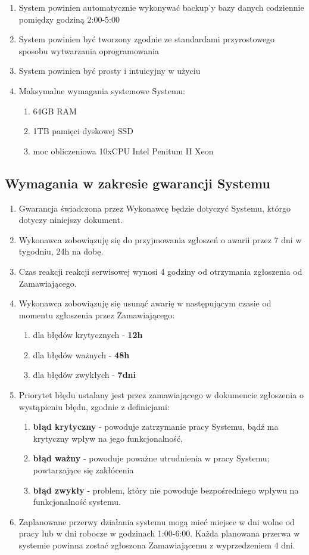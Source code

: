 \documentclass{article}
\begin{document}
\begin{enumerate}
	\item System powinien automatycznie wykonywać backup’y bazy danych codziennie pomiędzy godziną 2:00-5:00
	\item System powinien być tworzony zgodnie ze standardami przyrostowego sposobu  wytwarzania oprogramowania
	\item System powinien być prosty i intuicyjny w użyciu
	\item Maksymalne wymagania systemowe Systemu:
	\begin{enumerate}
		\item 64GB RAM
		\item 1TB pamięci dyskowej SSD
		\item moc obliczeniowa 10xCPU Intel Penitum II Xeon
	\end{enumerate}

	
\end{enumerate}


\subsection{Wymagania w zakresie gwarancji Systemu}
\begin{enumerate}
	\item Gwarancja świadczona przez Wykonawcę będzie dotyczyć Systemu, którgo dotyczy niniejszy dokument.
	\item Wykonawca zobowiązuję się do przyjmowania zgłoszeń o awarii przez 7 dni w tygodniu, 24h na dobę.
	\item Czas reakcji reakcji serwisowej wynosi 4 godziny od otrzymania zgłoszenia od Zamawiającego.
	\item Wykonawca zobowiązuję się usunąć awarię w następującym czasie od momentu zgłoszenia przez Zamawiającego:
	\begin{enumerate}
		\item dla błędów krytycznych - \textbf{12h}
		\item dla błędów ważnych - \textbf{48h} 
		\item dla błędów zwykłych - \textbf{7dni}
	\end{enumerate}

	\item Priorytet błędu ustalany jest przez zamawiającego w dokumencie zgłoszenia o wystąpieniu błędu, zgodnie z definicjami:
	\begin{enumerate}
		\item \textbf{błąd krytyczny} - powoduje zatrzymanie pracy Systemu, bądź ma krytyczny wpływ na jego funkcjonalność,
		\item \textbf{błąd ważny} - powoduje poważne utrudnienia w pracy Systemu; powtarzające się zakłócenia
		\item \textbf{błąd zwykły} - problem, który nie powoduje bezpośredniego wpływu na funkcjonalność systemu.
	\end{enumerate}

	\item Zaplanowane przerwy działania systemu mogą mieć miejsce w dni wolne od pracy lub w dni robocze w godzinach 1:00-6:00. Każda planowana przerwa w systemie powinna zostać zgłoszona Zamawiającemu z wyprzedzeniem 4 dni.
	
\end{enumerate}
\end{document}

